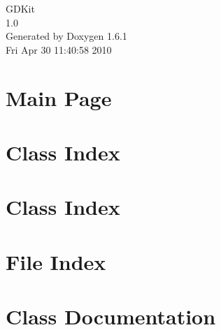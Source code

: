 \documentclass[a4paper]{book}
\begin{document}
\hypersetup{pageanchor=false}
\begin{titlepage}
\vspace*{7cm}
\begin{center}
{\Large GDKit \\[1ex]\large 1.0 }\\
\vspace*{1cm}
{\large Generated by Doxygen 1.6.1}\\
\vspace*{0.5cm}
{\small Fri Apr 30 11:40:58 2010}\\
\end{center}
\end{titlepage}
\clearemptydoublepage
{}
\tableofcontents
\clearemptydoublepage
{}
\hypersetup{pageanchor=true}
\chapter{Main Page}
\label{index}\hypertarget{index}{}
\chapter{Class Index}

\chapter{Class Index}

\chapter{File Index}

\chapter{Class Documentation}



































\end{document}
